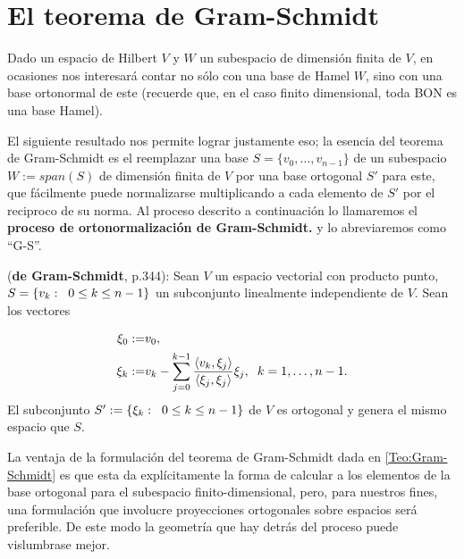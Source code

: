 \section{El teorema de Gram-Schmidt}
\label{ap: gram schmidt}
Dado un espacio de Hilbert $V$
y $W$ un subespacio de dimensión finita de $V$,
en ocasiones nos interesará contar no sólo con una
base de Hamel $W$, sino con una base ortonormal de este
(recuerde que, en el caso finito dimensional, toda
BON es una base Hamel).
 
El siguiente resultado nos permite lograr justamente eso;
la esencia del teorema de Gram-Schmidt es el reemplazar una base
$S=\{ v_{0}, \ldots ,v_{n-1} \}$ de un subespacio 
$W := span(S)$ de dimensión finita de $V$ 
por una base ortogonal $S'$ para este, que
fácilmente puede normalizarse multiplicando a cada elemento 
de $S'$ por el reciproco de su norma.
Al proceso descrito a continuación lo llamaremos
el \textbf{proceso de ortonormalización de Gram-Schmidt.}
y lo abreviaremos como ``G-S''.\\

\begin{teo} \label{Teo:Gram-Schmidt}
(\textbf{de Gram-Schmidt}, \cite{friedberg} p.344): 
Sean $V$ un espacio vectorial
con producto punto, $S=\{ v_{k} : \hspace{0.2cm} 0 \leq k \leq n-1 \}$ un
subconjunto linealmente independiente de $V$. 
Sean los vectores

\[
\begin{split}
\xi_{0}:= & v_{0}, \\
\xi_{k} := & v_{k} - \sum\limits_{j=0}^{k-1}
\frac{\langle v_{k} , \xi_{j} \rangle}{
\langle \xi_{j} , \xi_{j} \rangle}  \xi_{j},
\hspace{0.2cm} k=1, \ldots ,n-1.
\end{split}
\]
\noindent
El subconjunto 
$S':=\{ \xi_{k} : \hspace{0.2cm} 0 \leq k \leq n-1  \}$ de $V$
es ortogonal y genera 
el mismo espacio que $S$.
\end{teo}


La ventaja de la formulación del teorema
de Gram-Schmidt dada en \ref{Teo:Gram-Schmidt}
es que esta
da explícitamente la forma de calcular a los
elementos de la base ortogonal para el subespacio
finito-dimensional, pero,
para nuestros fines, una formulación que
involucre proyecciones ortogonales sobre espacios
será preferible. De este modo la geometría
que hay detrás del proceso puede
vislumbrase mejor. 


